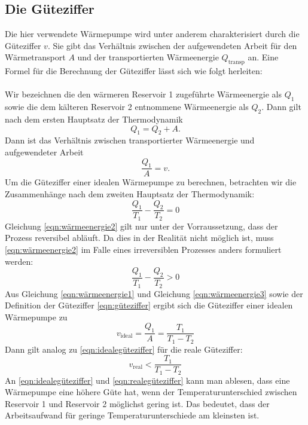 \documentclass{scrartcl} %
\begin{document}
  \subsection{Die Güteziffer}
  Die hier verwendete Wärmepumpe wird unter anderem charakterisiert durch die Güteziffer $ v $. Sie gibt das Verhältnis zwischen der aufgewendeten Arbeit für den Wärmetransport
  $ A $ und der transportierten Wärmeenergie $ Q_\text{transp} $ an. Eine Formel für die Berechnung der Güteziffer lässt sich wie folgt herleiten: \\
  \\
  Wir bezeichnen die den wärmeren Reservoir 1 zugeführte Wärmeenergie als $ Q_\text{1} $ sowie die dem kälteren Reservoir 2 entnommene Wärmeenergie als $ Q_\text{2} $.
  Dann gilt nach dem ersten Hauptsatz der Thermodynamik
  \begin{equation}
    Q_\text{1} = Q_\text{2} + A.
    \label{eqn:wärmeenergie1}
  \end{equation}
  Dann ist das Verhältnis zwischen transportierter Wärmeenergie und aufgewendeter Arbeit
  \begin{equation}
    \frac{Q_\text{1}}{A} = v.
    \label{eqn:güteziffer}
  \end{equation}
  Um die Güteziffer einer idealen Wärmepumpe zu berechnen, betrachten wir die Zusammenhänge nach dem zweiten Hauptsatz der Thermodynamik:
  \begin{equation}
    \frac{Q_\text{1}}{T_\text{1}} - \frac{Q_\text{2}}{T_\text{2}} = 0
    \label{eqn:wärmeenergie2}
  \end{equation}
  Gleichung \eqref{eqn:wärmeenergie2} gilt nur unter der Vorraussetzung, dass der Prozess reversibel abläuft.
  Da dies in der Realität nicht möglich ist, muss \eqref{eqn:wärmeenergie2} im Falle eines irreversiblen Prozesses
  anders formuliert werden:
  \begin{equation}
  	\frac{Q_\text{1}}{T_\text{1}} - \frac{Q_\text{2}}{T_\text{2}} > 0
  	\label{eqn:wärmeenergie3}
  \end{equation}
	Aus Gleichung \eqref{eqn:wärmeenergie1} und Gleichung \eqref{eqn:wärmeenergie3} sowie der Definition der Güteziffer
	\eqref{eqn:güteziffer} ergibt sich die Güteziffer einer idealen Wärmepumpe zu
	\begin{equation}
		v_\text{ideal} = \frac{Q_\text{1}}{A} = \frac{T_\text{1}}{T_\text{1} - T_\text{2}}
		\label{eqn:idealegüteziffer}
	\end{equation}
	Dann gilt analog zu \eqref{eqn:idealegüteziffer} für die reale Güteziffer:
	\begin{equation}
		v_\text{real} < \frac{T_\text{1}}{T_\text{1}-T_\text{2}}
		\label{eqn:realegüteziffer}
	\end{equation}
	An \eqref{eqn:idealegüteziffer} und \eqref{eqn:realegüteziffer} kann man ablesen, dass eine Wärmepumpe eine höhere Güte hat,
	wenn der Temperaturunterschied zwischen Reservoir 1 und Reservoir 2 möglichst gering ist. Das bedeutet, dass der Arbeitsaufwand
	für geringe Temperaturunterschiede am kleinsten ist.
\end{document}
